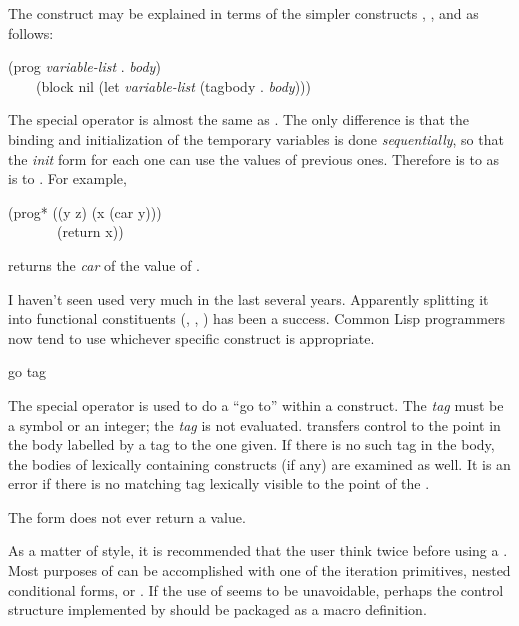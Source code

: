 \begin{defmac}
The  construct may be explained in terms of the simpler
constructs , , and  as
follows:
\begin{lisp}
(prog \emph{variable-list}  . \emph{body}) \\
~~~\EQ\ (block nil (let \emph{variable-list}  (tagbody . \emph{body})))
\end{lisp}

The  special operator is almost the same as .  The only
difference is that the binding and initialization of the temporary
variables is done \emph{sequentially}, so that the \emph{init} form for each
one can use the values of previous ones.
Therefore  is to  as  is to .
For example,
\begin{lisp}
(prog* ((y z) (x (car y))) \\
~~~~~~~(return x))
\end{lisp}
returns the \emph{car} of the value of .

\begin{new}
I haven't seen  used very much in the last several years.
Apparently splitting it into functional constituents
(, , ) has been a success.  Common Lisp
programmers now tend to use whichever specific construct is appropriate.
\end{new}
\end{defmac}

\begin{defspec}
go tag

The  special operator is used to do a ``go to'' within
a  construct.  The \emph{tag} must be a symbol or an integer;
the \emph{tag} is not evaluated.
 transfers control to the point in the body labelled by a
tag  to the one given.  If there is no such tag in the body, the
bodies of lexically containing  constructs
(if any) are examined as well.
It is an error if there is no matching tag lexically visible
to the point of the .

The  form does not ever return a value.

As a matter of style, it is recommended that the user think twice before
using a .  Most purposes of  can be accomplished with one of
the iteration primitives, nested conditional forms, or
.  If the use of  seems to be unavoidable,
perhaps the control structure implemented by  should be packaged
as a macro definition.
\end{defspec}

